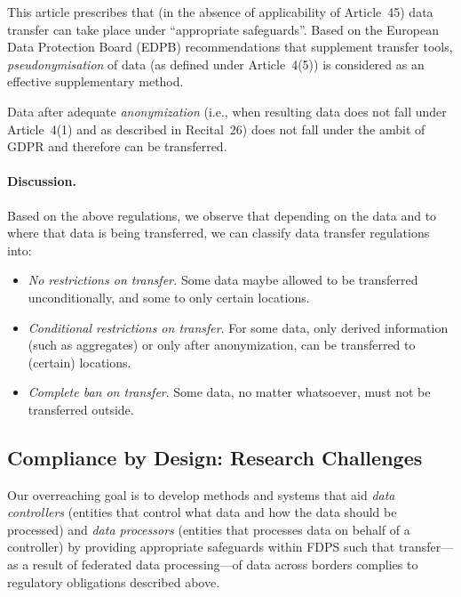 \documentclass[11pt]{article}
\begin{document}
 This article prescribes that (in the absence of
applicability of Article~45) data transfer can take place
under ``appropriate safeguards''. Based on the European Data
Protection Board (EDPB) recommendations that supplement
transfer tools, \emph{pseudonymisation} of data (as defined
under Article~4(5)) is considered as an effective
supplementary method.


 Data after adequate
\emph{anonymization} (i.e., when resulting data does not
fall under Article~4(1) and as described in Recital~26) does
not fall under the ambit of GDPR and therefore can be
transferred.


\paragraph{Discussion.}Based on the above regulations, we
observe that depending on the data and to where that data is
being transferred, we can classify data transfer regulations
into:
\begin{itemize}
    \item\emph{No restrictions on transfer.} Some data
    maybe allowed to be transferred unconditionally, and
    some to only certain locations.
    \item \emph{Conditional restrictions on transfer}. For
    some data, only derived information (such as
    aggregates) or only after anonymization, can be
    transferred to (certain) locations.
    \item \emph{Complete ban on transfer}. Some data, no
    matter whatsoever, must not be transferred outside.
\end{itemize}


\subsection{Compliance by Design: Research Challenges} 
\label{sub:challenges}


Our overreaching goal is to develop methods and systems that
aid \emph{data controllers} (entities that control what data
and how the data should be processed) and \emph{data
processors} (entities that processes data on behalf of a
controller) by providing appropriate safeguards within FDPS
such that transfer---as a result of federated data
processing---of data across borders complies to regulatory
obligations described above.
\end{document}
